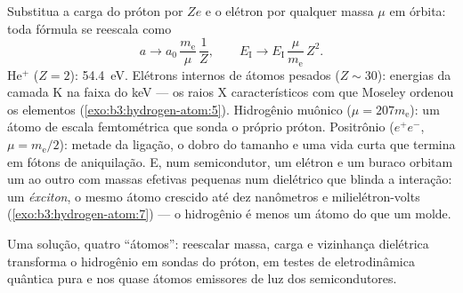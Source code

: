 \begin{example}\label{ex:b3:hydrogen-atom:scaling}
Substitua a carga do próton por $Ze$ e o elétron por qualquer massa
$\mu$ em órbita: toda fórmula se reescala como
\[
a \to a_0\,\frac{m_{\text{e}}}{\mu}\,\frac1Z , \qquad
E_{\text{I}} \to E_{\text{I}}\,\frac{\mu}{m_{\text{e}}}\,Z^2 .
\]
He$^+$ ($Z = 2$): \qty{54.4}{eV}. Elétrons internos de átomos pesados
($Z \sim 30$): energias da camada K na faixa do keV --- os raios X
característicos com que Moseley ordenou os elementos
(\cref{exo:b3:hydrogen-atom:5}). Hidrogênio muônico ($\mu = 207
m_{\text{e}}$): um átomo de escala femtométrica que sonda o próprio
próton. Positrônio ($e^+e^-$, $\mu = m_{\text{e}}/2$): metade da
ligação, o dobro do tamanho e uma vida curta que termina em fótons de
aniquilação. E, num semicondutor, um elétron e um buraco orbitam um ao
outro com massas efetivas pequenas num dielétrico que blinda a
interação: um \emph{éxciton}, o mesmo átomo crescido até dez nanômetros
e milielétron-volts (\cref{exo:b3:hydrogen-atom:7}) --- o hidrogênio é
menos um átomo do que um molde.
\end{example}

\begin{omfigure}

{\small Uma solução, quatro ``átomos'': reescalar massa, carga e
vizinhança dielétrica transforma o hidrogênio em sondas do próton, em
testes de eletrodinâmica quântica pura e nos quase átomos emissores de
luz dos semicondutores.}
\end{omfigure}

